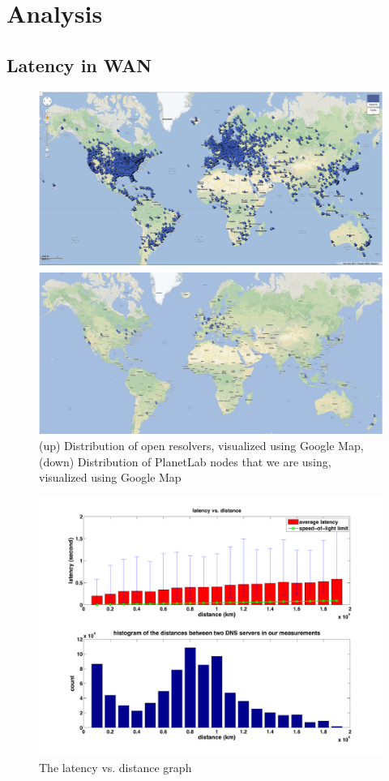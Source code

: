 
\section{Analysis}
\label{sec:analysis}

\subsection{Latency in WAN}
\label{sec:latency-wan-1}

\begin{figure}
  \centering
  \includegraphics[width=\linewidth]{../figs/geo_viz.pdf}
  \caption{(up) Distribution of open resolvers, visualized using Google Map, (down) Distribution of PlanetLab nodes that we are using, visualized using Google Map}
  \label{fig:geo_viz}
\end{figure}

\begin{figure}
  \centering
  \includegraphics[width=\linewidth]{../figs/latency_dist.pdf}
  \caption{The latency vs. distance graph}
  \label{fig:latency_dist}
\end{figure}

